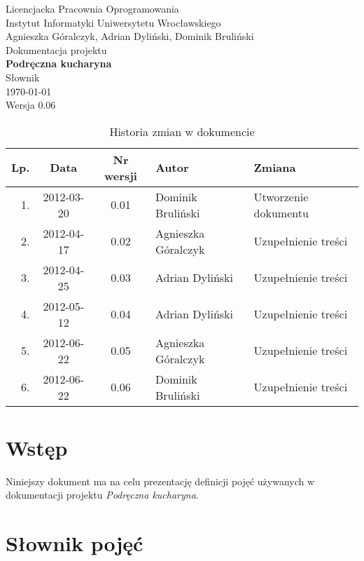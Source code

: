 \documentclass[12pt,leqno, twoside]{mwart}
\begin{document}
\thispagestyle{empty}
\begin{center}
Licencjacka Pracownia Oprogramowania \\ Instytut
Informatyki Uniwersytetu Wrocławskiego \\
\vspace{4cm}
\Large Agnieszka Góralczyk, Adrian Dyliński, Dominik Bruliński \\
\vspace{0.5cm}
\huge Dokumentacja projektu\\ \textbf{Podręczna kucharyna}\\ \Large Słownik\\
\vspace{1cm}
\normalsize \today \\
\vspace{2cm}
\normalsize Wersja 0.06
\end{center}

\newpage

\begin{table}
	\centering
	\caption{Historia zmian w dokumencie}
		\begin{tabular}{|r|c|c|l|l|}
		\hline
		Lp. & Data       & Nr wersji & Autor               & Zmiana \\ \hline
		1.   & 2012-03-20 & 0.01 & Dominik Bruliński & Utworzenie dokumentu \\ \hline
		2. & 2012-04-17 & 0.02 & Agnieszka Góralczyk & Uzupełnienie treści \\ \hline
		3. & 2012-04-25 & 0.03 & Adrian Dyliński & Uzupełnienie treści \\ \hline
		4. & 2012-05-12 & 0.04 & Adrian Dyliński & Uzupełnienie treści \\ \hline
		5. & 2012-06-22 & 0.05 & Agnieszka Góralczyk & Uzupełnienie treści \\ \hline
		6. & 2012-06-22 & 0.06 & Dominik Bruliński & Uzupełnienie treści \\ \hline
		\end{tabular}
\end{table}

\newpage

\tableofcontents
\newpage

\section{Wstęp}
	Niniejszy dokument ma na celu prezentację definicji pojęć używanych w dokumentacji projektu \emph{Podręczna kucharyna}.
	\section{Słownik pojęć}
	
\end{document}
